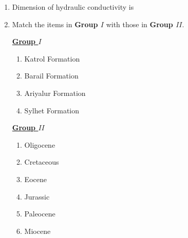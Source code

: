 \documentclass[journal,12pt,onecolumn]{IEEEtran}
\theoremstyle{remark}
\begin{document}
\begin{enumerate}
        \item Dimension of hydraulic conductivity is \hfill{}
            \begin{enumerate}
            \end{enumerate}

        \item Match the items in \textbf{Group $I$} with those in \textbf{Group $II$}. \hfill{}
        \newpage
            \begin{multicols}{2}
                \underline{\textbf{Group $I$}}
                \begin{enumerate}[start=16]
                    \item Katrol Formation
                    \item Barail Formation
                    \item Ariyalur Formation
                    \item Sylhet Formation
                \end{enumerate}
        
                \columnbreak
        
                \underline{\textbf{Group $II$}}
                \begin{enumerate}
                    \item Oligocene
                    \item Cretaceous
                    \item Eocene
                    \item Jurassic
                    \item Paleocene
                    \item Miocene
                \end{enumerate}
            \end{multicols}
            \begin{enumerate}
            \end{enumerate}


\end{enumerate}
\end{document}

